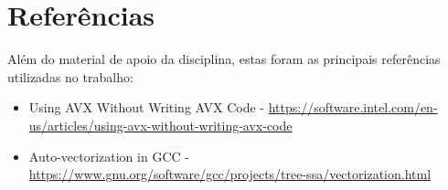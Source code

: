 \documentclass[12pt]{article}
\begin{document}
\section{Referências}

Além do material de apoio da disciplina, estas foram as principais referências utilizadas no trabalho:

\begin{itemize}
\item  Using AVX Without Writing AVX Code -
\url{https://software.intel.com/en-us/articles/using-avx-without-writing-avx-code}
\item Auto-vectorization in GCC - \url{https://www.gnu.org/software/gcc/projects/tree-ssa/vectorization.html}
\end{itemize}
\end{document}
